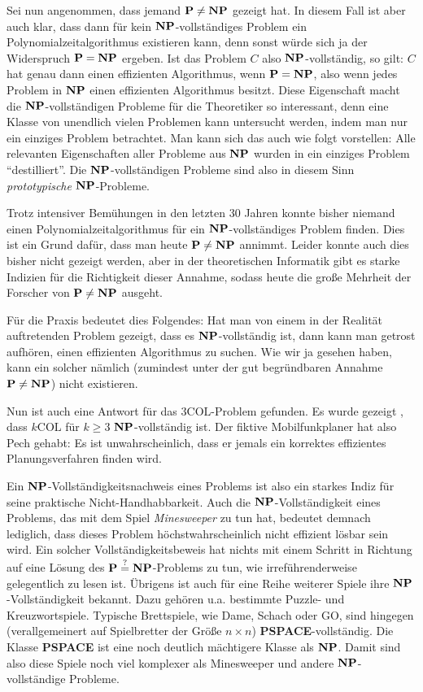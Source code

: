 Sei nun angenommen, dass jemand $\mathbf{P} \not= \mathbf{N}\mathbf{P}$ gezeigt hat. In diesem
Fall ist aber auch klar, dass dann für kein $\mathbf{N}\mathbf{P}$-vollständiges
Problem ein Polynomialzeitalgorithmus existieren kann, denn sonst
würde sich ja der Widerspruch $\mathbf{P} = \mathbf{N}\mathbf{P}$ ergeben.  Ist das Problem $C$
also $\mathbf{N}\mathbf{P}$-vollständig, so gilt: $C$ hat genau dann einen effizienten
Algorithmus, wenn $\mathbf{P}=\mathbf{N}\mathbf{P}$, also wenn jedes Problem in $\mathbf{N}\mathbf{P}$ einen
effizienten Algorithmus besitzt. Diese Eigenschaft macht die
$\mathbf{N}\mathbf{P}$-vollständigen Probleme für die Theoretiker so interessant, denn
eine Klasse von unendlich vielen Problemen kann untersucht werden,
indem man nur ein einziges Problem betrachtet. Man kann sich das auch
wie folgt vorstellen: Alle relevanten Eigenschaften aller Probleme aus
$\mathbf{N}\mathbf{P}$ wurden in ein einziges Problem "`destilliert"'. Die
$\mathbf{N}\mathbf{P}$-vollständigen Probleme sind also in diesem Sinn
\emph{prototypische} $\mathbf{N}\mathbf{P}$-Probleme.

Trotz intensiver Bemühungen in den letzten 30 Jahren konnte bisher
niemand einen Polynomialzeitalgorithmus für ein $\mathbf{N}\mathbf{P}$-vollständiges
Problem finden. Dies ist ein Grund dafür, dass man heute
$\mathbf{P} \not= \mathbf{N}\mathbf{P}$ annimmt. Leider konnte auch dies bisher nicht gezeigt
werden, aber in der theoretischen Informatik gibt es starke Indizien
für die Richtigkeit dieser Annahme, sodass heute die große Mehrheit
der Forscher von $\mathbf{P}
\not= \mathbf{N}\mathbf{P}$ ausgeht.

Für die Praxis bedeutet dies Folgendes: Hat man von einem in der
Realität auftretenden Problem gezeigt, dass es $\mathbf{N}\mathbf{P}$-vollständig ist,
dann kann man getrost aufhören, einen effizienten Algorithmus zu
suchen. Wie wir ja gesehen haben, kann ein solcher nämlich (zumindest
unter der gut begründbaren Annahme $\mathbf{P}\neq\mathbf{N}\mathbf{P}$) nicht existieren.

Nun ist auch eine Antwort für das $3\mathrm{COL}$-Problem gefunden. Es wurde
gezeigt \cite{GaJo79}, dass $k\mathrm{COL}$ für $k \ge 3$ $\mathbf{N}\mathbf{P}$-vollständig
ist. Der fiktive Mobilfunkplaner hat also Pech gehabt: Es ist
unwahrscheinlich, dass er jemals ein korrektes effizientes
Planungsverfahren finden wird.

Ein $\mathbf{N}\mathbf{P}$-Vollständigkeitsnachweis eines Problems ist also ein starkes
Indiz für seine praktische Nicht-Handhabbarkeit. Auch die
$\mathbf{N}\mathbf{P}$-Vollständigkeit eines Problems, das mit dem Spiel
\emph{Minesweeper} zu tun hat, bedeutet demnach
lediglich, dass dieses Problem höchstwahrscheinlich nicht effizient
lösbar sein wird. Ein solcher Vollständigkeitsbeweis hat nichts mit
einem Schritt in Richtung auf eine Lösung des
$\mathbf{P}\stackrel{?}{=}\mathbf{N}\mathbf{P}$-Problems zu tun, wie irreführenderweise
gelegentlich zu lesen ist. Übrigens ist auch für eine Reihe weiterer
Spiele ihre $\mathbf{N}\mathbf{P}$-Vollständigkeit bekannt. Dazu gehören {u.a.}
bestimmte Puzzle- und Kreuzwortspiele. Typische Brettspiele, wie Dame,
Schach oder GO, sind hingegen (verallgemeinert auf Spielbretter der
Größe $n\times n$) \textbf{PSPACE}-vollständig. Die Klasse
\textbf{PSPACE} ist eine noch deutlich mächtigere Klasse als
$\mathbf{N}\mathbf{P}$. Damit sind also diese Spiele noch viel komplexer als
Minesweeper und andere $\mathbf{N}\mathbf{P}$-vollständige Probleme.


